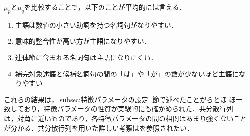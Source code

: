 $\mu_{p}$と$\mu_{q}$を比較することで，以下のことが平均的には言える．
\begin{enumerate}
\item 主語は数値の小さい助詞を持つ名詞句がなりやすい．
\item 意味的整合性が高い方が主語になりやすい．
\item 連体節に含まれる名詞句は主語になりにくい．
\item 補完対象述語と候補名詞句の間の「は」や「が」の数が少ないほど主語になりやすい．
\end{enumerate}
これらの結果は，\ref{subsec:特徴パラメータの設定} 節で述べたことがらとほ
ぼ一致しており，特徴パラメータの性質が実験的にも確かめられた．共分散行列
は，対角に近いものであり，各特徴パラメータの間の相関はあまり強くないこと
が分かる．共分散行列を用いた詳しい考察は\cite{金93}を参照されたい．

